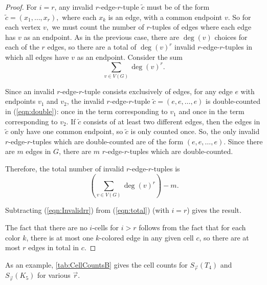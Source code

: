 \documentclass{amsart}
\newcommand{\Sr}{S_{\vec{r}}}
\theoremstyle{definition}
\theoremstyle{remark}
\begin{document}
\begin{proof}
For $i=r$, any invalid $r$-edge-$r$-tuple $\tilde c$ must be of the form $\tilde{c}=(x_1,\dots,x_r),$ where each $x_k$ is an edge, with a common endpoint $v.$ So for each vertex $v,$ we must count the number of $r$-tuples of edges where each edge has $v$ as an endpoint. As in the previous case, there are $\deg(v)$ choices for each of the $r$ edges, so there are a total of $\deg(v)^r$ invalid $r$-edge-$r$-tuples in which all edges have $v$ as an endpoint. Consider the sum 
\begin{equation}\label{eqn:double}
    \sum_{v\in V(G)}\deg(v)^r.
\end{equation}

Since an invalid $r$-edge-$r$-tuple consists exclusively of edges, for any edge $e$ with endpoints $v_1$ and $v_2$, the invalid $r$-edge-$r$-tuple $\tilde c = (e,e,\dots,e)$ is double-counted in (\ref{eqn:double}): once in the term corresponding to $v_1$ and once in the term corresponding to $v_2.$  If $\tilde c$ consists of at least two different edges, then the edges in $\tilde c$ only have one common endpoint, so $\tilde c$ is only counted once. So, the only invalid $r$-edge-$r$-tuples which are double-counted are of the form $(e,e,\dots,e).$ Since there are $m$ edges in $G$, there are $m$ $r$-edge-$r$-tuples which are double-counted.

Therefore, the total number of invalid $r$-edge-$r$-tuples is 
\begin{equation}\label{eqn:Invalidrr}
    \left(\sum_{v\in V(G)}\deg(v)^r\right)-m.
\end{equation}

Subtracting (\ref{eqn:Invalidrr}) from (\ref{eqn:total}) (with $i=r$) gives the result.

The fact that there are no $i$-cells for $i>r$ follows from the fact that for each color $k$, there is at most one $k$-colored edge in any given cell $c$, so there are at most $r$ edges in total in $c$.
\end{proof}

As an example, \cref{tab:CellCountsB} gives the cell counts for $\Sr(T_4)$ and $\Sr(K_5)$ for various $\vec r.$
\end{document}
